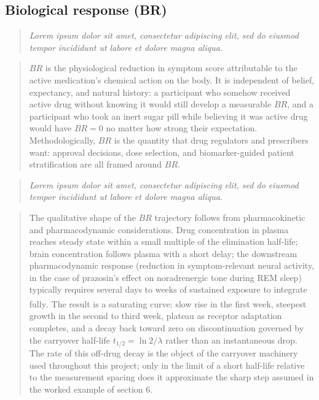 \documentclass[
  11pt,
]{article}
\newenvironment{rgt}{%
  \begin{quote}\small\itshape\color[RGB]{20,60,160}}{%
  \end{quote}}
\newenvironment{orig}{%
  \begin{quote}\normalsize\color[gray]{0.55}}{%
  \end{quote}}
\begin{document}
\subsection{Biological response (BR)}\label{biological-response-br}

\begin{rgt}
Lorem ipsum dolor sit amet, consectetur adipiscing elit, sed do eiusmod tempor incididunt ut labore et dolore magna aliqua.

\end{rgt}

\begin{orig}
\(BR\) is the physiological reduction in symptom score attributable
to the active medication's chemical action on the body. It is
independent of belief, expectancy, and natural history: a
participant who somehow received active drug without knowing it
would still develop a measurable \(BR\), and a participant who
took an inert sugar pill while believing it was active drug
would have \(BR = 0\) no matter how strong their expectation.
Methodologically, \(BR\) is the quantity that drug regulators and
prescribers want: approval decisions, dose selection, and
biomarker-guided patient stratification are all framed around
\(BR\).

\end{orig}

\begin{rgt}
Lorem ipsum dolor sit amet, consectetur adipiscing elit, sed do eiusmod tempor incididunt ut labore et dolore magna aliqua.

\end{rgt}

\begin{orig}
The qualitative shape of the \(BR\) trajectory follows from
pharmacokinetic and pharmacodynamic considerations. Drug
concentration in plasma reaches steady state within a small
multiple of the elimination half-life; brain concentration
follows plasma with a short delay; the downstream
pharmacodynamic response (reduction in symptom-relevant neural
activity, in the case of prazosin's effect on noradrenergic tone
during REM sleep) typically requires several days to weeks of
sustained exposure to integrate fully\textsuperscript{}.
The result is a saturating curve: slow rise in the first week,
steepest growth in the second to third week, plateau as receptor
adaptation completes, and a decay back toward zero on
discontinuation governed by the carryover half-life
\(t_{1/2} = \ln 2 / \lambda\) rather than an instantaneous drop.
The rate of this off-drug decay is the object of the carryover
machinery used throughout this project; only in the limit of a
short half-life relative to the measurement spacing does it
approximate the sharp step assumed in the worked example of
section 6.

\end{orig}
\end{document}
